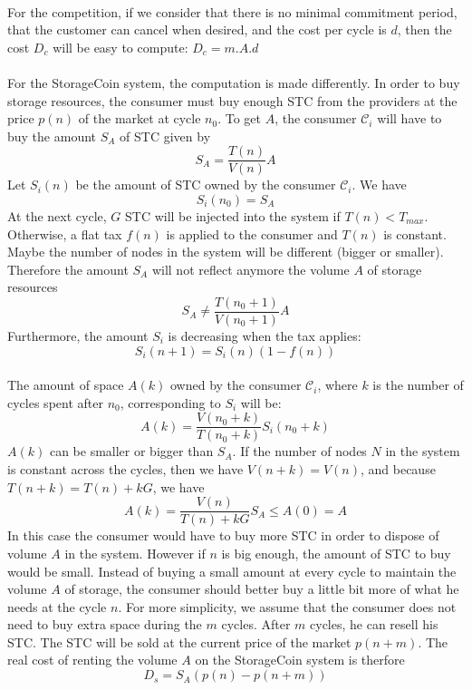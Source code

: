 \documentclass[a4paper,12pt]{article}
\begin{document}
\paragraph*{}
For the competition, if we consider that there is no minimal commitment period, that the customer can cancel when desired, and the cost per cycle is $d$, then the cost $D_{c}$ will be easy to compute: $D_{c}=m.A.d$

\paragraph*{}
For the StorageCoin system, the computation is made differently. In order to buy storage resources, the consumer must buy enough STC from the providers at the price $p(n)$ of the market at cycle $n_{0}$.
To get $A$, the consumer $\mathscr{C}_{i}$ will have to buy the amount $S_{A}$ of STC given by 
\[S_{A}=\frac{T(n)}{V(n)}A\]
Let $S_{i}(n)$ be the amount of STC owned by the consumer $\mathscr{C}_{i}$.
We have \[S_{i}(n_{0})=S_{A}\]
At the next cycle, $G$ STC will be injected into the system if $T(n)<T_{max}$. 
Otherwise, a flat tax $f(n)$ is applied to the consumer and $T(n)$ is constant.
Maybe the number of nodes in the system will be different (bigger or smaller). 
Therefore the amount $S_{A}$ will not reflect anymore the volume $A$ of storage resources 
\[S_{A}\neq \frac{T(n_{0}+1)}{V(n_{0}+1)}A\]
Furthermore, the amount $S_{i}$ is decreasing when the tax applies:
\[S_{i}(n+1)=S_{i}(n)(1-f(n))\]

\paragraph*{}
The amount of space $A(k)$ owned by the consumer $\mathscr{C}_{i}$, where $k$ is the number of cycles spent after $n_{0}$, corresponding to $S_{i}$ will be: 
\[A(k)=\frac{V(n_{0}+k)}{T(n_{0}+k)}S_{i}(n_{0}+k)\]
$A(k)$ can be smaller or bigger than $S_{A}$. If the number of nodes $N$ in the system is constant across the cycles, then we have $V(n+k)=V(n)$, and because $T(n+k)=T(n)+kG$, we have
\[A(k)=\frac{V(n)}{T(n)+kG}S_{A}\le A(0)=A\]
In this case the consumer would have to buy more STC in order to dispose of volume $A$ in the system.
However if $n$ is big enough, the amount of STC to buy would be small.
Instead of buying a small amount at every cycle to maintain the volume $A$ of storage, the consumer should better buy a little bit more of what he needs at the cycle $n$.
For more simplicity, we assume that the consumer does not need to buy extra space during the $m$ cycles.
After $m$ cycles, he can resell his STC. The STC will be sold at the current price of the market $p(n + m)$.
The real cost of renting the volume $A$ on the StorageCoin system is therfore
\[D_{s}=S_{A}(p(n)-p(n+m))\]
\end{document}

